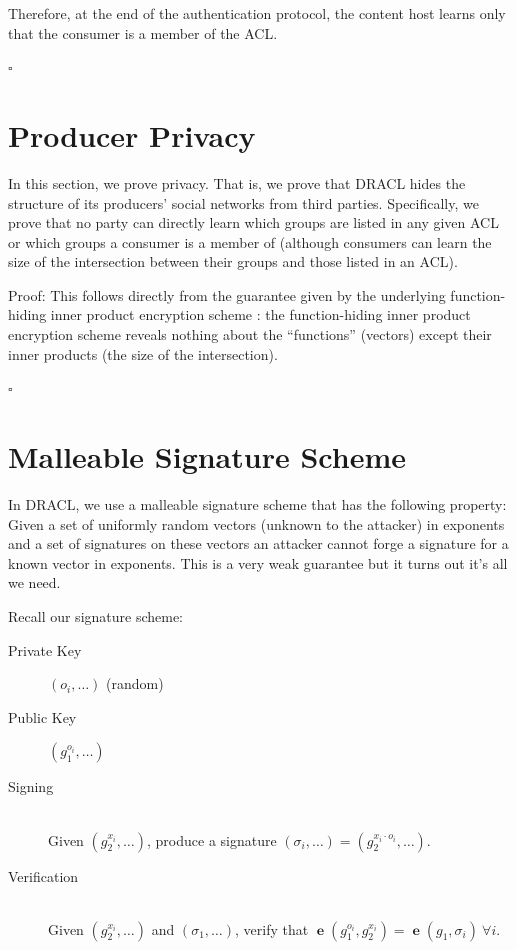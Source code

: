 \documentclass[pdftex,12pt,a4papaer,twoside,notitlepage]{report}
\DeclareMathOperator{\e}{\mathbf{e}}
\begin{document}
\begin{appendices}
Therefore, at the end of the authentication protocol, the content host learns
only that the consumer is a member of the ACL.

{\hfill $\square$}

\section{Producer Privacy}

In this section, we prove privacy. That is, we prove that DRACL hides the
structure of its producers' social networks from third parties. Specifically, we
prove that no party can directly learn which groups are listed in any given ACL or
which groups a consumer is a member of (although consumers can learn the size of
the intersection between their groups and those listed in an ACL).

Proof: This follows directly from the guarantee given by the underlying
function-hiding inner product encryption scheme \cite{inner-product}: the
function-hiding inner product encryption scheme reveals nothing about the
``functions'' (vectors) except their inner products (the size of the
intersection).

{\hfill $\square$}

\section{Malleable Signature Scheme}

In DRACL, we use a malleable signature scheme that has the following property:
Given a set of uniformly random vectors (unknown to the attacker) in exponents
and a set of signatures on these vectors an attacker cannot forge a signature
for a known vector in exponents. This is a very weak guarantee but it turns out
it's all we need.

Recall our signature scheme:
\begin{description}
  \item[Private Key] $(o_i, \ldots)$ (random)
  \item[Public Key] $(g_1^{o_i}, \ldots)$
  \item[Signing] \hfill \\
    Given $(g_2^{x_i}, \ldots)$, produce a signature $(\sigma_i, \ldots) = (g_2^{x_i\cdot o_i}, \ldots)$.
  \item[Verification] \hfill \\
    Given $(g_2^{x_i}, \ldots)$ and $(\sigma_1, \ldots)$,
    verify that $\e(g_1^{o_i}, g_2^{x_i}) = \e(g_1, \sigma_i)~\forall i$.
\end{description}


\end{appendices}
\end{document}
